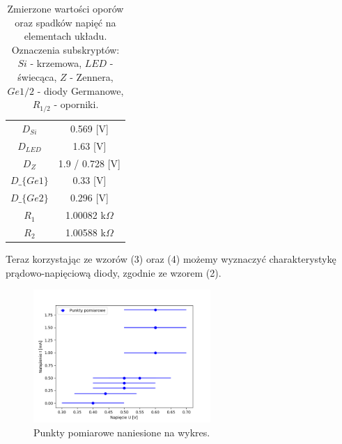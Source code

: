 \documentclass[10pt,a4paper]{article}
\begin{document}
\begin{table}[htp!]
\begin{center}
\begin{tabular}{|c|c|}
\hline
$D_{Si}$ 					  & 0.569 {[}V{]}					  \\
$D_{LED}$                      & 1.63 {[}V{]}                       \\
$D_Z$                          & 1.9 / 0.728 {[}V{]}                \\
$D\_\{Ge1\}$                   & 0.33 {[}V{]}                       \\
$D\_\{Ge2\}$                   & 0.296 {[}V{]}                      \\
$R_1$                          & 1.00082 k$\Omega$                  \\
$R_2$                          & 1.00588 k$\Omega$                 \\
\hline
\end{tabular}
\end{center}
\caption{Zmierzone wartości oporów oraz spadków napięć na elementach układu. Oznaczenia subskryptów: $Si$ - krzemowa, $LED$ - świecąca, $Z$ - Zennera, $Ge1/2$ - diody Germanowe,  $R_{1/2}$ - oporniki.}
\label{opory}
\end{table}
Teraz korzystając ze wzorów (3) oraz (4) możemy wyznaczyć charakterystykę prądowo-napięciową diody, zgodnie ze wzorem (2).
\begin{figure}[ht!]	
	\begin{center}
		\includegraphics[width = 0.6\textwidth]{i_u.png}
		\caption{Punkty pomiarowe naniesione na wykres.}
		\label{i_u}
	\end{center}
\end{figure}	
\end{document}
